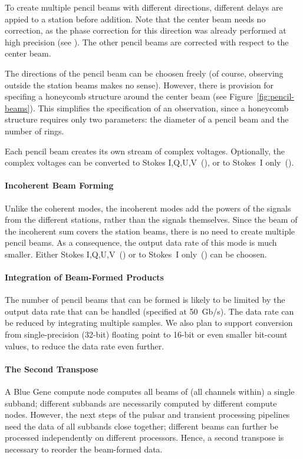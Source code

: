 To create multiple pencil beams with different directions, different delays
are appied to a station before addition.
Note that the center beam needs no correction, as the phase correction for
this direction was already performed at high precision (see ).
The other pencil beams are corrected with respect to the center beam.

The directions of the pencil beam can be choosen freely (of course, observing
outside the station beams makes no sense).
However, there is provision for specifing a honeycomb structure around the
center beam (see Figure~\ref{fig:pencil-beams}).
This simplifies the specification of an observation, since a honeycomb structure
requires only two parameters: the diameter of a pencil beam and the number
of rings.

Each pencil beam creates its own stream of complex voltages.
Optionally, the complex voltages can be converted to Stokes
I,Q,U,V~(), or to Stokes~I only~().


\paragraph{Incoherent Beam Forming}
Unlike the coherent modes, the incoherent modes add the powers of the signals
from the different stations, rather than the signals themselves.
Since the beam of the incoherent sum covers the station beams, there is no
need to create multiple pencil beams.
As a consequence, the output data rate of this mode is much smaller.
Either Stokes I,Q,U,V~() or to Stokes~I
only~() can be choosen.


\paragraph{Integration of Beam-Formed Products }
The number of pencil beams that can be formed is likely to be limited by the
output data rate that can be handled (specified at 50~Gb/s).
The data rate can be reduced by integrating multiple samples.
We also plan to support conversion from single-precision (32-bit) floating
point to 16-bit or even smaller bit-count values, to reduce the data rate
even further.


\paragraph{The Second Transpose }
A Blue Gene compute node computes all beams of (all channels within) a
single subband; different subbands are necessarily computed by different 
compute nodes.
However, the next steps of the pulsar and transient processing pipelines
need the data of all subbands close together; different beams can further be
processed independently on different processors.
Hence, a second transpose is necessary to reorder the beam-formed data.


